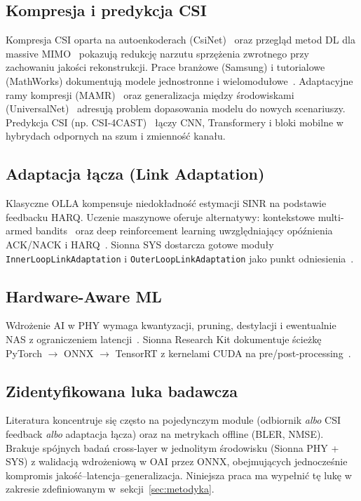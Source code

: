 \documentclass[12pt, a4paper]{article}
\begin{document}
\subsection{Kompresja i predykcja CSI}

Kompresja CSI oparta na autoenkoderach (CsiNet)~\cite{wen-csinet-2018} oraz przegląd metod DL dla massive MIMO~\cite{arxiv-2206-14383} pokazują redukcję narzutu sprzężenia zwrotnego przy zachowaniu jakości rekonstrukcji. Prace branżowe (Samsung) i tutorialowe (MathWorks) dokumentują modele jednostronne i wielomodułowe~\cite{samsung-csi,mathworks-csi}. Adaptacyjne ramy kompresji (MAMR)~\cite{ieee-9417115} oraz generalizacja między środowiskami (UniversalNet)~\cite{arxiv-2409-13494} adresują problem dopasowania modelu do nowych scenariuszy. Predykcja CSI (np. CSI-4CAST)~\cite{arxiv-2510-12996} łączy CNN, Transformery i bloki mobilne w hybrydach odpornych na szum i zmienność kanału.

\subsection{Adaptacja łącza (Link Adaptation)}

Klasyczne OLLA kompensuje niedokładność estymacji SINR na podstawie feedbacku HARQ. Uczenie maszynowe oferuje alternatywy: kontekstowe multi-armed bandits~\cite{acm-mcs} oraz deep reinforcement learning uwzględniający opóźnienia ACK/NACK i HARQ~\cite{arxiv-2603-00689}. Sionna SYS dostarcza gotowe moduły \texttt{InnerLoopLinkAdaptation} i \texttt{OuterLoopLinkAdaptation} jako punkt odniesienia~\cite{sionna-sys}.

\subsection{Hardware-Aware ML}

Wdrożenie AI w PHY wymaga kwantyzacji, pruning, destylacji i ewentualnie NAS z ograniczeniem latencji~\cite{arxiv-2409-02912,youtube-sionna}. Sionna Research Kit dokumentuje ścieżkę PyTorch $\rightarrow$ ONNX $\rightarrow$ TensorRT z kernelami CUDA na pre/post-processing~\cite{sionna-rk,neural-rx-repo}.

\subsection{Zidentyfikowana luka badawcza}

Literatura koncentruje się często na pojedynczym module (odbiornik \emph{albo} CSI feedback \emph{albo} adaptacja łącza) oraz na metrykach offline (BLER, NMSE). Brakuje spójnych badań cross-layer w jednolitym środowisku (Sionna PHY + SYS) z walidacją wdrożeniową w OAI przez ONNX, obejmujących jednocześnie kompromis jakość--latencja--generalizacja. Niniejsza praca ma wypełnić tę lukę w zakresie zdefiniowanym w~sekcji~\ref{sec:metodyka}.
\end{document}
